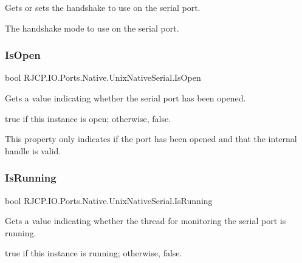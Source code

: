 Gets or sets the handshake to use on the serial port. 

The handshake mode to use on the serial port. \mbox{\label{class_r_j_c_p_1_1_i_o_1_1_ports_1_1_native_1_1_unix_native_serial_a1ad7c5fb46d22ac194b1f0f63c4e67bf}} 
\subsubsection{\texorpdfstring{IsOpen}{IsOpen}}
{\footnotesize\ttfamily bool R\+J\+C\+P.\+I\+O.\+Ports.\+Native.\+Unix\+Native\+Serial.\+Is\+Open\hspace{0.3cm}{\ttfamily [get]}}



Gets a value indicating whether the serial port has been opened. 

{\ttfamily true} if this instance is open; otherwise, {\ttfamily false}. 

This property only indicates if the port has been opened and that the internal handle is valid. \mbox{\label{class_r_j_c_p_1_1_i_o_1_1_ports_1_1_native_1_1_unix_native_serial_a56702f32ecf25b9bcee00da36a4c2504}} 
\subsubsection{\texorpdfstring{IsRunning}{IsRunning}}
{\footnotesize\ttfamily bool R\+J\+C\+P.\+I\+O.\+Ports.\+Native.\+Unix\+Native\+Serial.\+Is\+Running\hspace{0.3cm}{\ttfamily [get]}}



Gets a value indicating whether the thread for monitoring the serial port is running. 

{\ttfamily true} if this instance is running; otherwise, {\ttfamily false}. 

